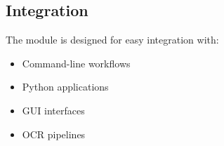 \subsection{Integration}
The module is designed for easy integration with:
\begin{itemize}
    \item Command-line workflows
    \item Python applications
    \item GUI interfaces
    \item OCR pipelines
\end{itemize} 